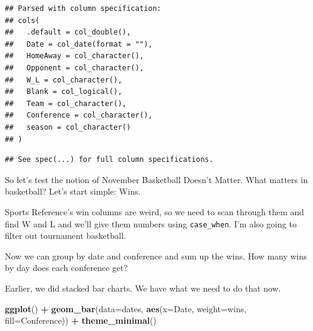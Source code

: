 \documentclass[]{book}
\newenvironment{Shaded}{\begin{snugshade}}{\end{snugshade}}
\newcommand{\DataTypeTok}[1]{\textcolor[rgb]{0.13,0.29,0.53}{#1}}
\newcommand{\DecValTok}[1]{\textcolor[rgb]{0.00,0.00,0.81}{#1}}
\newcommand{\KeywordTok}[1]{\textcolor[rgb]{0.13,0.29,0.53}{\textbf{#1}}}
\newcommand{\NormalTok}[1]{#1}
\newcommand{\OperatorTok}[1]{\textcolor[rgb]{0.81,0.36,0.00}{\textbf{#1}}}
\newcommand{\StringTok}[1]{\textcolor[rgb]{0.31,0.60,0.02}{#1}}
\begin{document}
\begin{verbatim}
## Parsed with column specification:
## cols(
##   .default = col_double(),
##   Date = col_date(format = ""),
##   HomeAway = col_character(),
##   Opponent = col_character(),
##   W_L = col_character(),
##   Blank = col_logical(),
##   Team = col_character(),
##   Conference = col_character(),
##   season = col_character()
## )
\end{verbatim}

\begin{verbatim}
## See spec(...) for full column specifications.
\end{verbatim}

So let's test the notion of November Basketball Doesn't Matter. What matters in basketball? Let's start simple: Wins.

Sports Reference's win columns are weird, so we need to scan through them and find W and L and we'll give them numbers using \texttt{case\_when}. I'm also going to filter out tournament basketball.

\begin{Shaded}
\end{Shaded}

Now we can group by date and conference and sum up the wins. How many wins by day does each conference get?

\begin{Shaded}
\end{Shaded}

Earlier, we did stacked bar charts. We have what we need to do that now.

\begin{Shaded}
\begin{Highlighting}[]
\KeywordTok{ggplot}\NormalTok{() }\OperatorTok{+}\StringTok{ }\KeywordTok{geom_bar}\NormalTok{(}\DataTypeTok{data=}\NormalTok{dates, }\KeywordTok{aes}\NormalTok{(}\DataTypeTok{x=}\NormalTok{Date, }\DataTypeTok{weight=}\NormalTok{wins, }\DataTypeTok{fill=}\NormalTok{Conference)) }\OperatorTok{+}\StringTok{ }\KeywordTok{theme_minimal}\NormalTok{()}
\end{Highlighting}
\end{Shaded}
\end{document}
